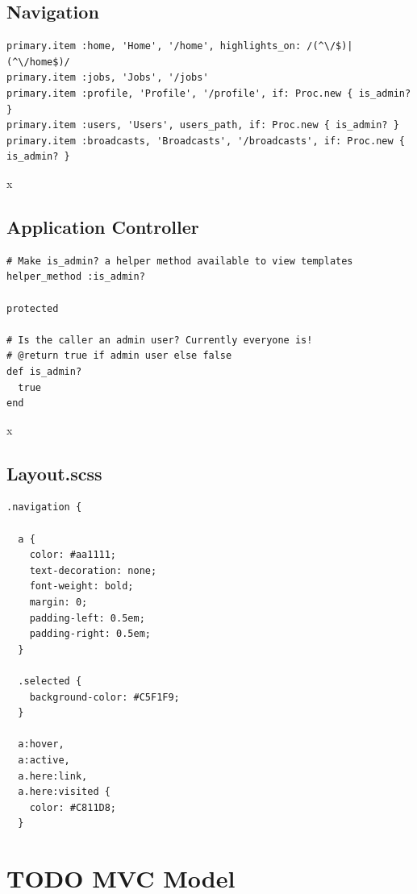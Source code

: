 \documentclass[a4paper]{article}
\begin{document}
\subsection{Navigation}
\label{sec-2-4}
\begin{listing}[H]
\begin{verbatim}
primary.item :home, 'Home', '/home', highlights_on: /(^\/$)|(^\/home$)/
primary.item :jobs, 'Jobs', '/jobs'
primary.item :profile, 'Profile', '/profile', if: Proc.new { is_admin? }
primary.item :users, 'Users', users_path, if: Proc.new { is_admin? }
primary.item :broadcasts, 'Broadcasts', '/broadcasts', if: Proc.new { is_admin? }
\end{verbatim}
\caption{x}
\end{listing}

\subsection{Application Controller}
\label{sec-2-5}
\begin{listing}[H]
\begin{verbatim}
# Make is_admin? a helper method available to view templates
helper_method :is_admin?

protected

# Is the caller an admin user? Currently everyone is!
# @return true if admin user else false
def is_admin?
  true
end
\end{verbatim}
\caption{x}
\end{listing}

\subsection{Layout.scss}
\label{sec-2-6}

\begin{verbatim}
.navigation {

  a {
    color: #aa1111;
    text-decoration: none;
    font-weight: bold;
    margin: 0;
    padding-left: 0.5em;
    padding-right: 0.5em;
  }

  .selected {
    background-color: #C5F1F9;
  }

  a:hover,
  a:active,
  a.here:link,
  a.here:visited {
    color: #C811D8;
  }
\end{verbatim}



\section{{\bfseries\sffamily TODO} MVC Model}
\label{sec-3}
\end{document}
